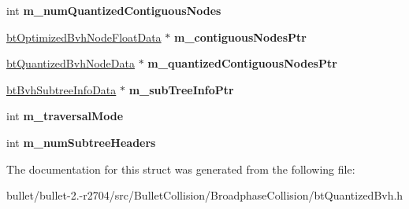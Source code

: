 \begin{DoxyCompactItemize}
\item 
\hypertarget{structbt_quantized_bvh_float_data_a46438c60a07ca07c08aa5a5603cab306}{int {\bfseries m\+\_\+num\+Quantized\+Contiguous\+Nodes}}\label{structbt_quantized_bvh_float_data_a46438c60a07ca07c08aa5a5603cab306}

\item 
\hypertarget{structbt_quantized_bvh_float_data_a1a959a80df9cfb3a065c4191c8d2bfee}{\hyperlink{structbt_optimized_bvh_node_float_data}{bt\+Optimized\+Bvh\+Node\+Float\+Data} $\ast$ {\bfseries m\+\_\+contiguous\+Nodes\+Ptr}}\label{structbt_quantized_bvh_float_data_a1a959a80df9cfb3a065c4191c8d2bfee}

\item 
\hypertarget{structbt_quantized_bvh_float_data_aab48deeef6a003c1f64a17b91cc8888d}{\hyperlink{structbt_quantized_bvh_node_data}{bt\+Quantized\+Bvh\+Node\+Data} $\ast$ {\bfseries m\+\_\+quantized\+Contiguous\+Nodes\+Ptr}}\label{structbt_quantized_bvh_float_data_aab48deeef6a003c1f64a17b91cc8888d}

\item 
\hypertarget{structbt_quantized_bvh_float_data_a70324fdbe58b8b9c67387935445b6a5b}{\hyperlink{structbt_bvh_subtree_info_data}{bt\+Bvh\+Subtree\+Info\+Data} $\ast$ {\bfseries m\+\_\+sub\+Tree\+Info\+Ptr}}\label{structbt_quantized_bvh_float_data_a70324fdbe58b8b9c67387935445b6a5b}

\item 
\hypertarget{structbt_quantized_bvh_float_data_a3a4a6152f77b1903d43f385d4028a68d}{int {\bfseries m\+\_\+traversal\+Mode}}\label{structbt_quantized_bvh_float_data_a3a4a6152f77b1903d43f385d4028a68d}

\item 
\hypertarget{structbt_quantized_bvh_float_data_a112edc65a5bdd7449e0976a282b90da4}{int {\bfseries m\+\_\+num\+Subtree\+Headers}}\label{structbt_quantized_bvh_float_data_a112edc65a5bdd7449e0976a282b90da4}

\end{DoxyCompactItemize}


The documentation for this struct was generated from the following file\+:\begin{DoxyCompactItemize}
\item 
bullet/bullet-\/2.-\/r2704/src/\+Bullet\+Collision/\+Broadphase\+Collision/bt\+Quantized\+Bvh.\+h\end{DoxyCompactItemize}
